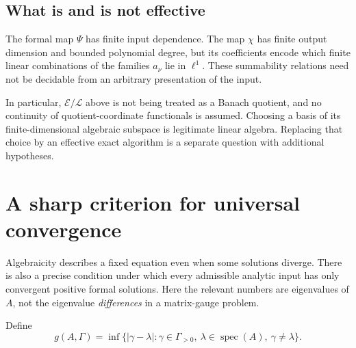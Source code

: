 \documentclass[11pt,a4paper]{article}
\numberwithin{equation}{section}
\theoremstyle{definition}
\theoremstyle{remark}
\newcommand{\G}{\Gamma}
\newcommand{\spec}{\operatorname{spec}}
\newcommand{\abs}[1]{\left\lvert #1\right\rvert}
\begin{document}
\subsection{What is and is not effective}
The formal map $\Psi$ has finite input dependence. The map $\chi$ has
finite output dimension and bounded polynomial degree, but its coefficients
encode which finite linear combinations of the families $a_\nu$ lie in
$\ell^1$. These summability relations need not be decidable from an arbitrary
presentation of the input.

In particular, $\mathcal E/\mathcal L$ above is not being treated as a
Banach quotient, and no continuity of quotient-coordinate functionals is
assumed. Choosing a basis of its finite-dimensional algebraic subspace is
legitimate linear algebra. Replacing that choice by an effective exact
algorithm is a separate question with additional hypotheses.

\section{A sharp criterion for universal convergence}
\label{sec:gap}

Algebraicity describes a fixed equation even when some solutions diverge.
There is also a precise condition under which every admissible analytic
input has only convergent positive formal solutions. Here the relevant
numbers are eigenvalues of $A$, not the eigenvalue \emph{differences} in a
matrix-gauge problem.

Define
\begin{equation}\label{eq:gap}
 g(A,\G)=\inf\{\abs{\gamma-\lambda}:\gamma\in\G_{>0},\
 \lambda\in\spec(A),\ \gamma\ne\lambda\}.
\end{equation}
\end{document}
